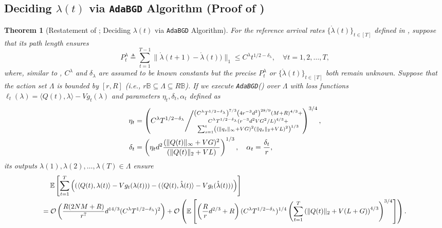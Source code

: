 \documentclass[11pt,fullpage,letterpaper]{article} %
\newtheorem{theorem}{Theorem}[section]
\renewcommand{\bm}[1]{#1}%
\renewcommand{\O}{\operatorname{\mathcal O}}
\newcommand{\E}{\operatornamewithlimits{\mathbb{E}}}
\newcommand{\BCOAlg}{\texttt{AdaBGD}\xspace}
\newcommand\scalemath[2]{\scalebox{#1}{\mbox{\ensuremath{\displaystyle #2}}}}
\begin{document}
\subsection{Deciding $\bm \lambda(t)$ via \BCOAlg Algorithm (Proof of )}\label{sec:general bandit part appendix}
\begin{theorem}[Restatement of ; Deciding $\bm \lambda(t)$ via \BCOAlg Algorithm]
For the reference arrival rates $\{\mathring{\bm \lambda}(t)\}_{t\in [T]}$ defined in , suppose that its path length ensures
\begin{equation*}
P_t^\lambda\triangleq \sum_{t=1}^{T-1} \lVert \mathring{\bm \lambda}({t+1}) - \mathring{\bm \lambda}(t)) \rVert_1\le C^\lambda t^{1/2 - \delta_\lambda},\quad \forall t=1,2,\ldots,T,
\end{equation*}
where, similar to , $C^\lambda$ and $\delta_\lambda$ are assumed to be known constants but the precise $P_t^\lambda$ or $\{\mathring{\bm \lambda}(t)\}_{t\in [T]}$ both remain unknown.
Suppose that the action set $\Lambda$ is bounded by $[r,R]$ (\textit{i.e.}, $r\mathbb B\subseteq \Lambda\subseteq R\mathbb B$).
If we execute \BCOAlg () over $\Lambda$ with loss functions $\ell_t(\bm \lambda)=\langle \bm Q(t),\bm \lambda\rangle-V g_t(\bm \lambda)$ and parameters $\eta_t,\delta_t,\alpha_t$ defined as
\begin{align}
\eta_t&=\left (C^\lambda T^{1/2 - \delta_\lambda}\middle / \substack{\left (C^\lambda T^{1/2 - \delta_\lambda}\right )^{7/3} \left (4r^{-3} d^2 \right )^{28/9} \left (M+R\right )^{4/3}+\\
C^\lambda T^{1/2-\delta_\lambda} (r^{-3} d^2 VG^2 / L)^{4/3}+\\
\sum_{s=1}^t \left ((\lVert \bm q_s\rVert_\infty + VG)^2 (\lVert \bm q_s\rVert_2 + VL)^2\right )^{1/3}}\right )^{3/4}, \nonumber\\
\delta_t &= \left (\eta_t d^2 \frac{(\lVert \bm Q(t)\rVert_\infty + VG)^2}{(\lVert \bm Q(t)\rVert_2 + VL)}\right )^{1/3},\quad \alpha_t = \frac{\delta_t}{r},\label{eq:true learning rate in BCO appendix}
\end{align}
its outputs $\bm \lambda(1),\bm \lambda(2),\ldots,\bm \lambda(T) \in \Lambda$ ensure
\begin{align*}
&\scalemath{0.95}{\quad \E\left [\sum_{t=1}^T \left ((\langle \bm Q(t),\bm \lambda(t)\rangle - Vg_t(\bm \lambda(t))) - (\langle \bm Q(t),\mathring{\bm \lambda}(t)\rangle - Vg_t(\mathring{\bm \lambda}(t)))\right )\right ]}\\
&\scalemath{0.95}{=\O\left (\frac{R(2NM+R)}{r^7} d^{14/3} (C^\lambda T^{1/2-\delta_\lambda})^2\right )+\O\left (\E\left [\left (\frac{R}{r} d^{2/3}+R\right ) (C^\lambda T^{1/2 - \delta_\lambda})^{1/4} \left (\sum_{t=1}^T \left (\lVert \bm Q(t)\rVert_2 + V(L+G)\right )^{4/3}\right )^{3/4}\right ]\right ).}
\end{align*}
\end{theorem}
\end{document}
